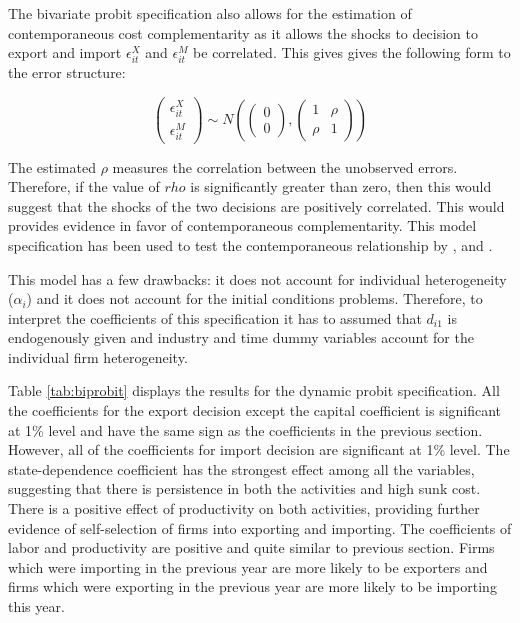 \documentclass[12pt]{article}
\begin{document}
The bivariate probit specification also allows for the estimation of 
contemporaneous cost complementarity as it allows the shocks to
decision to export and import 
$\epsilon_{it}^{X}$ and $\epsilon_{it}^{M}$  be
correlated. This gives gives the following form to the error
structure: 


\[\begin{pmatrix}
\epsilon_{it}^{X} \\
\epsilon_{it}^{M}
\end{pmatrix}\sim N\left(\begin{pmatrix}
0 \\
0
\end{pmatrix},\begin{pmatrix}
1 & \rho \\
\rho & 1
\end{pmatrix}\right)
\]


The estimated $\rho$ measures the correlation between the unobserved
errors. Therefore, if the value of $rho$ is significantly greater than
zero,  then this would suggest that the shocks of the two decisions
are positively correlated. This would provides evidence in favor 
of contemporaneous complementarity.  
This model specification has been used to test the contemporaneous relationship
by \textcite{aristei2013firms}, \textcite{aw2007export} and \textcite{manez2015dynamic}. 

This model has a few drawbacks: it does not account for individual
heterogeneity ($\alpha_{i}$) and it does not account for the  initial
conditions problems. Therefore, to interpret the coefficients of this
specification it has to assumed that $d_{i1}$ is 
endogenously given and  industry and time dummy variables account
for the individual firm heterogeneity.

Table \ref{tab:biprobit} displays the results for the dynamic probit specification. All
  the coefficients for the export decision except the capital coefficient is significant at
  1\% level and have the same sign 
  as the coefficients in the previous section. However,  all of the coefficients
  for import decision are significant at 1\% level. The
  state-dependence coefficient has the strongest effect among all
  the variables, suggesting that there is persistence in both the
  activities and high sunk cost. There is a positive effect of 
  productivity on both activities, providing further evidence of
  self-selection of firms into exporting and importing. The
  coefficients of labor and productivity are positive and
  quite similar to previous section. Firms which were importing in the previous year are more
  likely to be exporters and firms which were exporting in the
  previous year are more likely to be importing this year.
\end{document}
